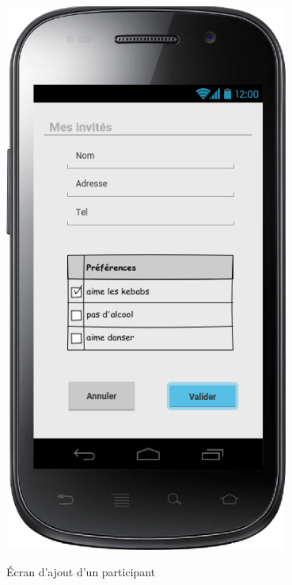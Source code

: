 \documentclass[a4paper, 12pt, notitlepage]{article} %
\begin{document}
\begin{maquetteFig}[!htb]
   \centering
     \includegraphics[width=0.7\textwidth]{ajout_participants.png}
     \caption{Écran d'ajout d'un participant}
     \label{Maquette:AjoutParticipant}
\end{maquetteFig}
\end{document}
